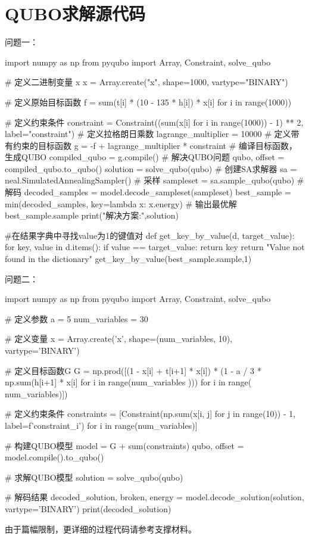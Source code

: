 \documentclass{MathorCupmodeling}
\begin{document}
	\section{QUBO求解源代码}
 问题一：
\begin{python}
import numpy as np
from pyqubo import Array, Constraint, solve_qubo

# 定义二进制变量 x
x = Array.create("x", shape=1000, vartype="BINARY")

# 定义原始目标函数
f = sum(t[i] * (10 - 135 * h[i]) * x[i] for i in range(1000))

# 定义约束条件
constraint = Constraint((sum(x[i] for i in range(1000)) - 1) ** 2, label="constraint")
# 定义拉格朗日乘数
lagrange_multiplier = 10000
# 定义带有约束的目标函数
g = -f + lagrange_multiplier * constraint
# 编译目标函数，生成QUBO
compiled_qubo = g.compile()
# 解决QUBO问题
qubo, offset = compiled_qubo.to_qubo()
solution = solve_qubo(qubo)
# 创建SA求解器
sa = neal.SimulatedAnnealingSampler()
# 采样
sampleset = sa.sample_qubo(qubo)
# 解码
decoded_samples = model.decode_sampleset(sampleset)
best_sample = min(decoded_samples, key=lambda x: x.energy)
# 输出最优解
best_sample.sample
print("解决方案:",solution)

#在结果字典中寻找value为1的键值对
def get_key_by_value(d, target_value):
    for key, value in d.items():
        if value == target_value:
            return key
    return "Value not found in the dictionary"
get_key_by_value(best_sample.sample,1)

\end{python}
问题二：
\begin{python}
import numpy as np
from pyqubo import Array, Constraint, solve_qubo

# 定义参数
a = 5
num_variables = 30

# 定义变量
x = Array.create('x', shape=(num_variables, 10), vartype='BINARY')

# 定义目标函数G
G = np.prod([(1 - x[i] + t[i+1] * x[i]) * (1 - a / 3 * np.sum(h[i+1] * x[i] for i in range(num_variables ))) for i in range( num_variables)])

# 定义约束条件
constraints = [Constraint(np.sum(x[i, j] for j in range(10)) - 1, label=f'constraint_{i}') for i in range(num_variables)]

# 构建QUBO模型
model = G + sum(constraints)
qubo, offset = model.compile().to_qubo()

# 求解QUBO模型
solution = solve_qubo(qubo)

# 解码结果
decoded_solution, broken, energy = model.decode_solution(solution, vartype='BINARY')
print(decoded_solution)

\end{python}
由于篇幅限制，更详细的过程代码请参考支撑材料。
\end{document}
